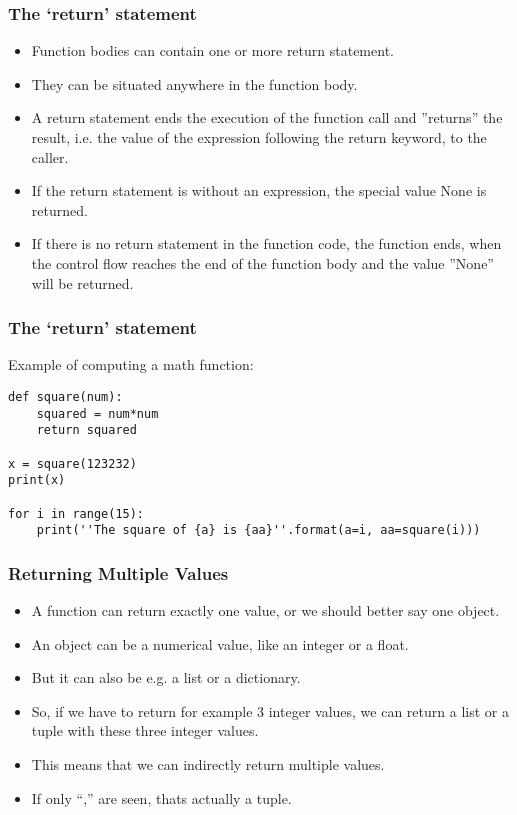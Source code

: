 \begin{frame}[fragile]\frametitle{The `return' statement }
    \begin{itemize}
    \item  Function bodies can contain one or more return statement. 
    \item They can be situated anywhere in the function body. 
    \item A return statement ends the execution of the function call and ''returns'' the result, i.e. the value of the expression following the return keyword, to the caller. 
    \item If the return statement is without an expression, the special value None is returned.
    \item If there is no return statement in the function code, the function ends, when the control flow reaches the end of the function body and the value ''None'' will be returned. 
    \end{itemize}
\end{frame}



\begin{frame}[fragile]\frametitle{The `return' statement }
Example of computing a math function:
\begin{lstlisting}
def square(num):
    squared = num*num
    return squared

x = square(123232)
print(x)

for i in range(15):
    print(''The square of {a} is {aa}''.format(a=i, aa=square(i)))
\end{lstlisting}
\end{frame}

\begin{frame}[fragile]\frametitle{Returning Multiple Values}
    \begin{itemize}
    \item  A function can return exactly one value, or we should better say one object. 
    \item An object can be a numerical value, like an integer or a float. 
    \item But it can also be e.g. a list or a dictionary. 
    \item So, if we have to return for example 3 integer values, we can return a list or a tuple with these three integer values. 
    \item This means that we can indirectly return multiple values.
    \item If only ``,'' are seen, thats actually a tuple.
        \end{itemize}
\end{frame}

